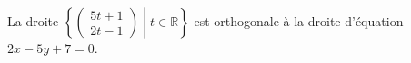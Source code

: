 La droite  $\left\{\begin{pmatrix}5t+1\\2t-1\end{pmatrix}\middle| t\in\mathbb{R}\right\}$ est orthogonale à la droite d'équation $2x-5y+7=0$.

\begin{reponses}
\end{reponses}

